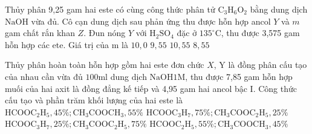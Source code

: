 \begin{ex}[3][]
	Thủy phân 9,25 gam hai este có cùng công thức phân tử $\mathrm{C}_3 \mathrm{H}_6 \mathrm{O}_2$ bằng dung dịch $\mathrm{NaOH}$ vừa đủ. Cô cạn dung dịch sau phản ứng thu được hỗn hợp ancol $Y$ và $m$ gam chất rắn khan $Z$. Đun nóng $Y$ với $\mathrm{H}_2 \mathrm{SO}_4$ đặc ở  $135^{\circ} \mathrm{C}$, thu được 3,575 gam hỗn hợp các ete. Giá trị của m là                           
	\choice
	{%
		$ 10,0 $
	}
	{%
	\True	$ 9,55 $
	}
	{%
	$ 	10,55 $
	}
	{%
	$ 	8,55 $
	}
	\sodongkeex[5]
\end{ex}
\begin{ex}[3][]
	Thủy phân hoàn toàn hỗn hợp gồm hai este đơn chức $X$, Y là đồng phân cấu tạo của nhau cần vừa đủ $100 \mathrm{ml}$ dung dịch $\mathrm{NaOH} 1 \mathrm{M}$, thu được 7,85 gam hỗn hợp muối của hai axit là đồng đẳng kế tiếp và 4,95 gam hai ancol bậc I. Công thức cấu tạo và phần trăm khối lượng của hai este là                
	\choice
	{%
		$\mathrm{HCOOC}_2 \mathrm{H}_5, 45 \% ; \mathrm{CH}_3 \mathrm{COOCH}_3, 55 \%$
	}
	{%
		$\mathrm{HCOOC}_3 \mathrm{H}_7, 75 \% ; \mathrm{CH}_3 \mathrm{COOC}_2 \mathrm{H}_5, 25 \%$
	}
	{%
	\True	$\mathrm{HCOOC}_3 \mathrm{H}_7, 25 \% ; \mathrm{CH}_3 \mathrm{COOC}_2 \mathrm{H}_5, 75 \%$
	}
	{%
		$\mathrm{HCOOC}_2 \mathrm{H}_5, 55 \% ; \mathrm{CH}_3 \mathrm{COOCH}_3, 45 \%$
	}
	\sodongkeex[5]
\end{ex}
